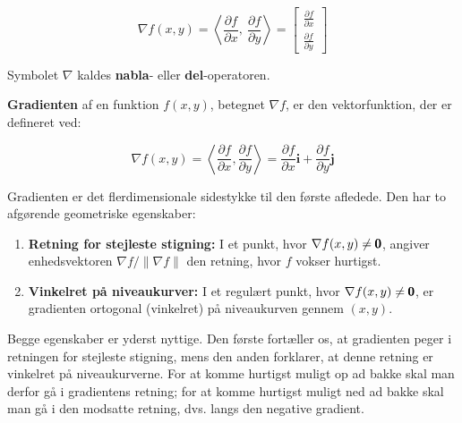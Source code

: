 $$
\nabla f(x, y) = \left\langle \frac{\partial f}{\partial x},\ \frac{\partial f}{\partial y} \right\rangle
= 
\begin{bmatrix}
    \frac{\partial f}{\partial x} \\
    \frac{\partial f}{\partial y}
\end{bmatrix}
$$

Symbolet $\nabla$ kaldes \textbf{nabla}- eller \textbf{del}-operatoren.

\begin{definition}[Gradienten]
\textbf{Gradienten} af en funktion \( f(x, y) \), betegnet \( \nabla f \), er den vektorfunktion, der er defineret ved:

$$
\nabla f(x, y) = \left\langle \frac{\partial f}{\partial x}, \frac{\partial f}{\partial y} \right\rangle = \frac{\partial f}{\partial x} \mathbf{i} + \frac{\partial f}{\partial y} \mathbf{j}
$$

\end{definition}

Gradienten er det flerdimensionale sidestykke til den første afledede. Den har to afgørende geometriske egenskaber:
\begin{enumerate}
    \item \textbf{Retning for stejleste stigning:} I et punkt, hvor \(\nabla f(x,y)\neq\pmb{0}\), angiver enhedsvektoren $\nabla f/\lVert\nabla f\rVert$ den retning, hvor \(f\) vokser hurtigst.
    \item \textbf{Vinkelret på niveaukurver:} I et regulært punkt, hvor \(\nabla f(x,y)\neq\pmb{0}\), er gradienten ortogonal (vinkelret) på niveaukurven gennem \((x,y)\).
\end{enumerate}

Begge egenskaber er yderst nyttige. Den første fortæller os, at gradienten peger i retningen for stejleste stigning, mens den anden forklarer, at denne retning er vinkelret på niveaukurverne. For at komme hurtigst muligt op ad bakke skal man derfor gå i gradientens retning; for at komme hurtigst muligt ned ad bakke skal man gå i den modsatte retning, dvs. langs den negative gradient.

